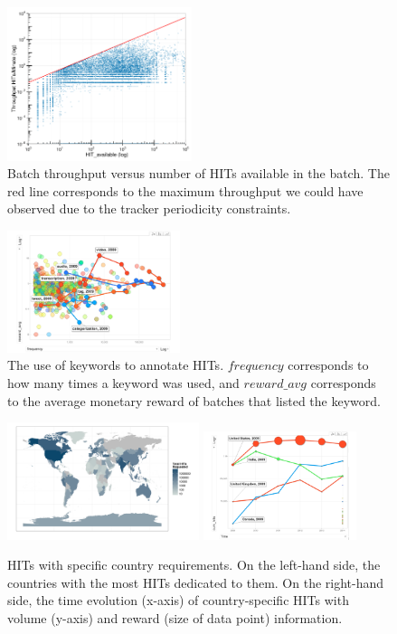 \begin{figure}[tb]
	\centering
		\includegraphics[width=0.48\textwidth]{figures/motiv_mturk}
	\caption{Batch throughput versus number of HITs available in the batch. The red line corresponds to the maximum throughput we could have observed due to the tracker periodicity constraints.\protect\footnotemark}
	\label{fig:motiv}
\end{figure}
\begin{figure}[tb]
	\centering
		\includegraphics[width=0.45\textwidth]{figures/tagEvolution}
	\caption{The use of keywords to annotate HITs. $frequency$ corresponds to how many times a keyword was used, and $reward\_avg$ corresponds to the average monetary reward of batches that listed the keyword.}
	\label{fig:tagEvolution}
\end{figure}
\begin{figure}[tb]
	\centering
		\includegraphics[width=0.5\textwidth]{figures/map}
		\includegraphics[width=0.40\textwidth]{figures/countriesTime}
	\caption{HITs with specific country requirements. On the left-hand side, the countries with the most HITs dedicated to them. On the right-hand side, the time evolution (x-axis) of country-specific HITs with volume (y-axis) and reward (size of data point) information.}
	\label{fig:country}
\end{figure}


